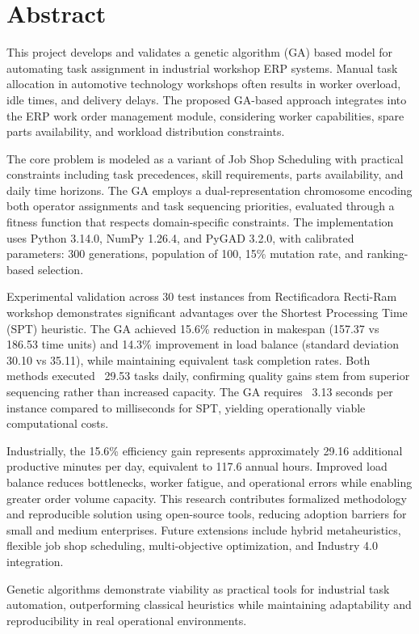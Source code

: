 \chapter*{Abstract}

This project develops and validates a genetic algorithm (GA) based model for automating task assignment in industrial workshop ERP systems. Manual task allocation in automotive technology workshops often results in worker overload, idle times, and delivery delays. The proposed GA-based approach integrates into the ERP work order management module, considering worker capabilities, spare parts availability, and workload distribution constraints.

The core problem is modeled as a variant of Job Shop Scheduling with practical constraints including task precedences, skill requirements, parts availability, and daily time horizons. The GA employs a dual-representation chromosome encoding both operator assignments and task sequencing priorities, evaluated through a fitness function that respects domain-specific constraints. The implementation uses Python 3.14.0, NumPy 1.26.4, and PyGAD 3.2.0, with calibrated parameters: 300 generations, population of 100, 15\% mutation rate, and ranking-based selection.

Experimental validation across 30 test instances from Rectificadora Recti-Ram workshop demonstrates significant advantages over the Shortest Processing Time (SPT) heuristic. The GA achieved 15.6\% reduction in makespan (157.37 vs 186.53 time units) and 14.3\% improvement in load balance (standard deviation 30.10 vs 35.11), while maintaining equivalent task completion rates. Both methods executed ~29.53 tasks daily, confirming quality gains stem from superior sequencing rather than increased capacity. The GA requires ~3.13 seconds per instance compared to milliseconds for SPT, yielding operationally viable computational costs.

Industrially, the 15.6\% efficiency gain represents approximately 29.16 additional productive minutes per day, equivalent to 117.6 annual hours. Improved load balance reduces bottlenecks, worker fatigue, and operational errors while enabling greater order volume capacity. This research contributes formalized methodology and reproducible solution using open-source tools, reducing adoption barriers for small and medium enterprises. Future extensions include hybrid metaheuristics, flexible job shop scheduling, multi-objective optimization, and Industry 4.0 integration.

Genetic algorithms demonstrate viability as practical tools for industrial task automation, outperforming classical heuristics while maintaining adaptability and reproducibility in real operational environments.


